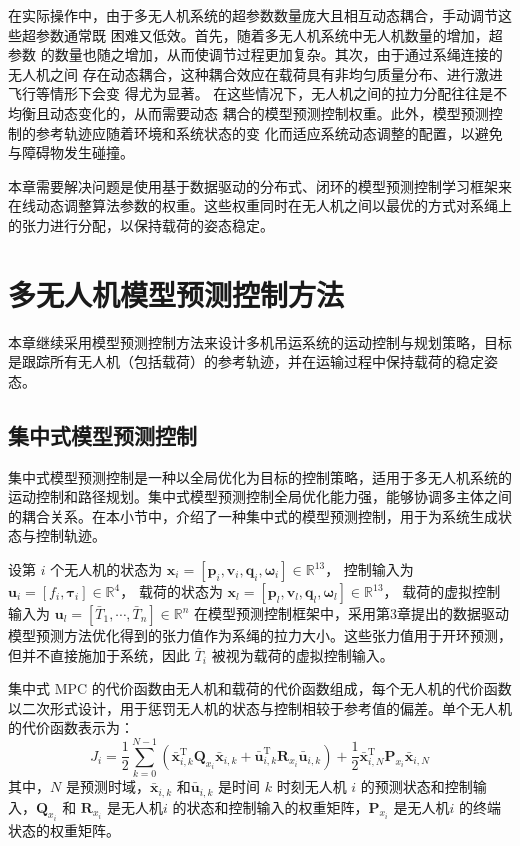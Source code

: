 \documentclass[lang=chs, degree=master, blindreview=true, winfonts=true]{yanputhesis}
\begin{document}
在实际操作中，由于多无人机系统的超参数数量庞大且相互动态耦合，手动调节这些超参数通常既
困难又低效。首先，随着多无人机系统中无人机数量的增加，超参数
的数量也随之增加，从而使调节过程更加复杂。其次，由于通过系绳连接的无人机之间
存在动态耦合，这种耦合效应在载荷具有非均匀质量分布、进行激进飞行等情形下会变
得尤为显著。
在这些情况下，无人机之间的拉力分配往往是不均衡且动态变化的，从而需要动态
耦合的模型预测控制权重。此外，模型预测控制的参考轨迹应随着环境和系统状态的变
化而适应系统动态调整的配置，以避免与障碍物发生碰撞。

本章需要解决问题是使用基于数据驱动的分布式、闭环的模型预测控制学习框架来在线动态调整算法参数的权重。这些权重同时在无人机之间以最优的方式对系绳上的张力进行分配，以保持载荷的姿态稳定。


\section{多无人机模型预测控制方法}
本章继续采用模型预测控制方法来设计多机吊运系统的运动控制与规划策略，目标是跟踪所有无人机（包括载荷）的参考轨迹，并在运输过程中保持载荷的稳定姿态。
\subsection{集中式模型预测控制}
集中式模型预测控制是一种以全局优化为目标的控制策略，适用于多无人机系统的运动控制和路径规划。集中式模型预测控制全局优化能力强，能够协调多主体之间的耦合关系。在本小节中，介绍了一种集中式的模型预测控制，用于为系统生成状态与控制轨迹。

设第 \( i \) 个无人机的状态为 
\(
\bm{x}_i = \left[ \bm{p}_i, \bm{v}_i, \bm{q}_i, \bm{\omega}_i \right] \in \mathbb{R}^{13}
\)，
控制输入为 
\(
\bm{u}_i = \left[ f_i, \bm{\tau}_i \right] \in \mathbb{R}^4
\)，
载荷的状态为 
\(
\bm{x}_l = \left[ \bm{p}_l, \bm{v}_l, \bm{q}_l, \bm{\omega}_l \right] \in \mathbb{R}^{13}
\)，
载荷的虚拟控制输入为 
\(
\bm{u}_l = \left[ \bar{T}_1, \cdots, \bar{T}_n \right] \in \mathbb{R}^n
\)
在模型预测控制框架中，采用第3章提出的数据驱动模型预测方法优化得到的张力值作为系绳的拉力大小。这些张力值用于开环预测，但并不直接施加于系统，因此 \( \bar{T}_i \) 被视为载荷的虚拟控制输入。


集中式 MPC 的代价函数由无人机和载荷的代价函数组成，每个无人机的代价函数以二次形式设计，用于惩罚无人机的状态与控制相较于参考值的偏差。单个无人机的代价函数表示为：
\begin{equation}
	J_i = \frac{1}{2}\sum_{k=0}^{N-1}\left(\bar{\boldsymbol{x}}_{i,k}^\mathrm{T}\boldsymbol{Q}_{x_i}\bar{\boldsymbol{x}}_{i,k}+\bar{\boldsymbol{u}}_{i,k}^\mathrm{T}\boldsymbol{R}_{x_i}\bar{\boldsymbol{u}}_{i,k}\right)+\frac{1}{2}\bar{\boldsymbol{x}}_{i,N}^\mathrm{T}\boldsymbol{P}_{x_i}\bar{\boldsymbol{x}}_{i,N}
	\label{juav}
\end{equation}
其中，$N$ 是预测时域，$\bar{\boldsymbol{x}}_{i,k}$ 和$\bar{\boldsymbol{u}}_{i,k}$ 是时间 $k$ 时刻无人机 $i$ 的预测状态和控制输入，$\boldsymbol{Q}_{x_i}$ 和 $\boldsymbol{R}_{x_i}$ 是无人机$i$ 的状态和控制输入的权重矩阵，$\boldsymbol{P}_{x_i}$ 是无人机$i$ 的终端状态的权重矩阵。
\end{document}
